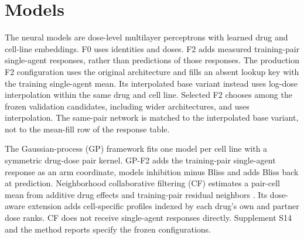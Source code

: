 \documentclass[11pt]{article}
\begin{document}


\section{Models}\label{sec:models}
The neural models are dose-level multilayer perceptrons with learned drug and cell-line embeddings. F0 uses identities and doses. F2 adds measured training-pair single-agent responses, rather than predictions of those responses. The production F2 configuration uses the original architecture and fills an absent lookup key with the training single-agent mean. Its interpolated base variant instead uses log-dose interpolation within the same drug and cell line. Selected F2 chooses among the frozen validation candidates, including wider architectures, and uses interpolation. The same-pair network is matched to the interpolated base variant, not to the mean-fill row of the response table.

The Gaussian-process (GP) framework fits one model per cell line with a symmetric drug-dose pair kernel. GP-F2 adds the training-pair single-agent response as an arm coordinate, models inhibition minus Bliss and adds Bliss back at prediction. Neighborhood collaborative filtering (CF) estimates a pair-cell mean from additive drug effects and training-pair residual neighbors \citep{sarwar2001,koren2008}. Its dose-aware extension adds cell-specific profiles indexed by each drug's own and partner dose ranks. CF does not receive single-agent responses directly. Supplement S14 and the method reports specify the frozen configurations.
\end{document}
